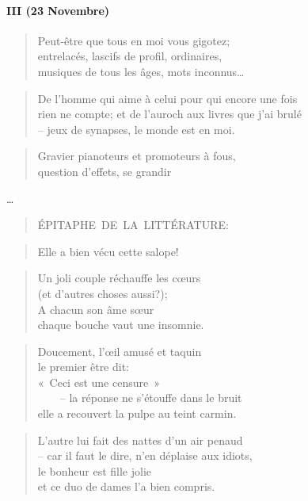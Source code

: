   \paragraph*{III (23 Novembre)}
  \begin{verse}
    Peut-être que tous en moi vous gigotez;\\
    entrelacés, lascifs de profil, ordinaires,\\
    musiques de tous les âges, mots inconnus…
  \end{verse}
  \begin{verse}
    De l’homme qui aime à celui pour qui encore une fois\\
    rien ne compte; et de l’auroch aux livres que j’ai brulé\\
    -- jeux de synapses, le monde est en moi.
  \end{verse}
  \begin{verse}
    Gravier pianoteurs et promoteurs à fous,\\
    question d’effets, se {\large gr}{\Large an}{\LARGE d}{\huge i}{\Huge r}
  \end{verse}
  \begin{center}
    {\Huge …}
  \end{center}
  \begin{verse}
    \textsc{ÉPITAPHE~DE~LA~LITTÉRATURE:}
  \end{verse}
  \begin{quotation}
    Elle a bien vécu cette salope!
  \end{quotation}
  \begin{verse}
    Un joli couple réchauffe les cœurs\\
    (et d’autres choses aussi?);\\
    A chacun son âme sœur\\
    chaque bouche vaut une insomnie.
  \end{verse}
  \begin{verse}
    Doucement, l’œil amusé et taquin\\
    le premier être dit:\\
    «~Ceci est une censure~»\\
    ~~~~-- la réponse ne s’étouffe dans le bruit\\
    elle a recouvert la pulpe au teint carmin.
  \end{verse}
  \begin{verse}
    L’autre lui fait des nattes d’un air penaud\\
    -- car il faut le dire, n’en déplaise aux idiots,\\
    le bonheur est fille jolie\\
    et ce duo de dames l’a bien compris.
  \end{verse}
